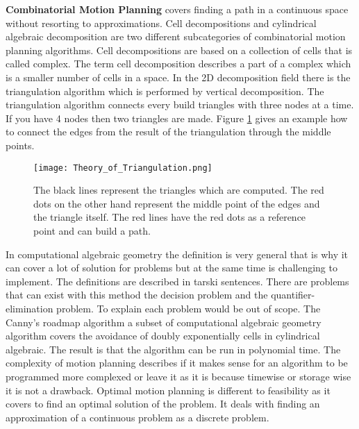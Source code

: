 \textbf{Combinatorial Motion Planning} covers finding a path in a continuous space without resorting to approximations. Cell decompositions and cylindrical algebraic decomposition are two different subcategories of combinatorial motion planning algorithms. Cell decompositions are based on a collection of cells that is called complex. The term cell decomposition describes a part of a complex which is a smaller number of cells in a space. In the 2D decomposition field there is the triangulation algorithm which is performed by vertical decomposition. The triangulation algorithm connects every build triangles with three nodes at a time. If you have 4 nodes then two triangles are made. Figure \ref{fig:Theory of Triangulation} gives an example how to connect the edges from the result of the triangulation through the middle points.
\begin{figure}[H]
    \centering
    \texttt{[image: Theory\_of\_Triangulation.png]}
    \caption{The black lines represent the triangles which are computed. The red dots on the other hand represent the middle point of the edges and the triangle itself. The red lines have the red dots as a reference point and can build a path. \cite{planning_algorithms_steven_m_lavalle}}
    \label{fig:Theory of Triangulation}
\end{figure}
In computational algebraic geometry the definition is very general that is why it can cover a lot of solution for problems but at the same time is challenging to implement. The definitions are described in tarski sentences. There are problems that can exist with this method the decision problem and the quantifier-elimination problem. To explain each problem would be out of scope. The Canny's roadmap algorithm a subset of computational algebraic geometry algorithm covers the avoidance of doubly exponentially cells in cylindrical algebraic. \cite{constructing_roadmaps_of_semi-algebraic_sets_I} The result is that the algorithm can be run in polynomial time. The complexity of motion planning describes if it makes sense for an algorithm to be programmed more complexed or leave it as it is because timewise or storage wise it is not a drawback. Optimal motion planning is different to feasibility as it covers to find an optimal solution of the problem. It deals with finding an approximation of a continuous problem as a discrete problem. \cite{planning_algorithms_steven_m_lavalle}


